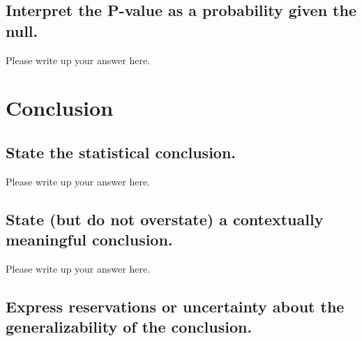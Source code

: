 \documentclass[
]{book}
\begin{document}
\hypertarget{interpret-the-p-value-as-a-probability-given-the-null.-2}{%
\subsection*{Interpret the P-value as a probability given the null.}\label{interpret-the-p-value-as-a-probability-given-the-null.-2}}

Please write up your answer here.

\hypertarget{conclusion-2}{%
\section*{Conclusion}\label{conclusion-2}}

\hypertarget{state-the-statistical-conclusion.-2}{%
\subsection*{State the statistical conclusion.}\label{state-the-statistical-conclusion.-2}}

Please write up your answer here.

\hypertarget{state-but-do-not-overstate-a-contextually-meaningful-conclusion.-2}{%
\subsection*{State (but do not overstate) a contextually meaningful conclusion.}\label{state-but-do-not-overstate-a-contextually-meaningful-conclusion.-2}}

Please write up your answer here.

\hypertarget{express-reservations-or-uncertainty-about-the-generalizability-of-the-conclusion.-2}{%
\subsection*{Express reservations or uncertainty about the generalizability of the conclusion.}\label{express-reservations-or-uncertainty-about-the-generalizability-of-the-conclusion.-2}}
\end{document}

